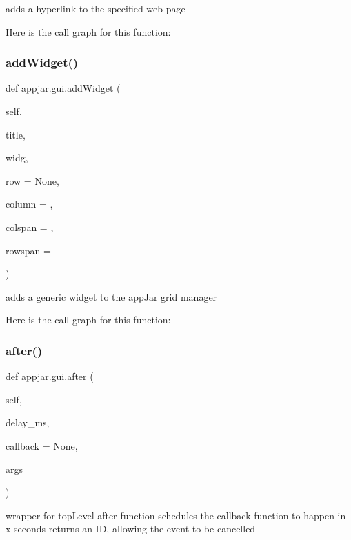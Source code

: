 \begin{DoxyVerb}adds a hyperlink to the specified web page \end{DoxyVerb}
 Here is the call graph for this function\+:
\mbox{\label{classappjar_1_1gui_a217dd64635f6be53036ea9ebdc860aca}} 
\subsubsection{\texorpdfstring{add\+Widget()}{addWidget()}}
{\footnotesize\ttfamily def appjar.\+gui.\+add\+Widget (\begin{DoxyParamCaption}\item[{}]{self,  }\item[{}]{title,  }\item[{}]{widg,  }\item[{}]{row = {\ttfamily None},  }\item[{}]{column = {},  }\item[{}]{colspan = {},  }\item[{}]{rowspan = {} }\end{DoxyParamCaption})}

\begin{DoxyVerb}adds a generic widget to the appJar grid manager \end{DoxyVerb}
 Here is the call graph for this function\+:
\mbox{\label{classappjar_1_1gui_a1fde7d8815e07abdeec5f885eebf3080}} 
\subsubsection{\texorpdfstring{after()}{after()}}
{\footnotesize\ttfamily def appjar.\+gui.\+after (\begin{DoxyParamCaption}\item[{}]{self,  }\item[{}]{delay\+\_\+ms,  }\item[{}]{callback = {\ttfamily None},  }\item[{}]{args }\end{DoxyParamCaption})}

\begin{DoxyVerb}wrapper for topLevel after function
    schedules the callback function to happen in x seconds
    returns an ID, allowing the event to be cancelled \end{DoxyVerb}
 \mbox{\label{classappjar_1_1gui_a9868fb4807bcf042789c84d29ab47d0f}} 
